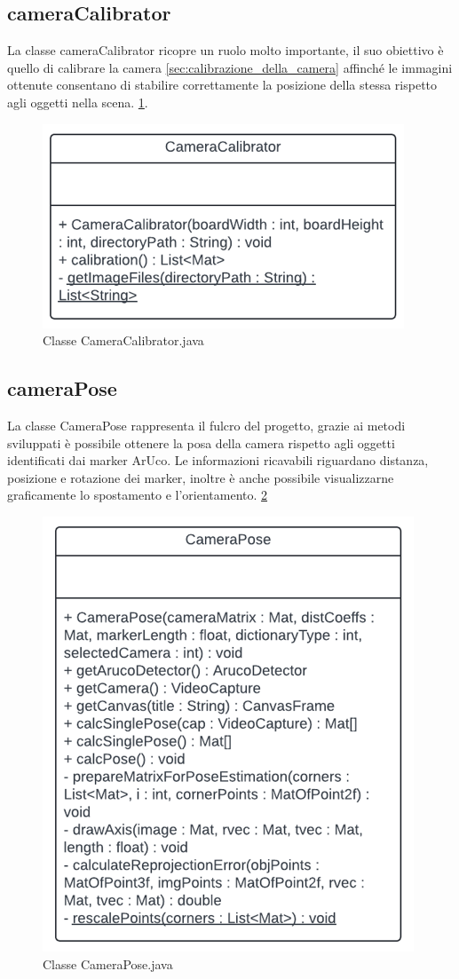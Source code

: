 \documentclass[12pt,a4paper,openright,twoside]{book}
\begin{document}
\subsection{cameraCalibrator}
La classe cameraCalibrator ricopre un ruolo molto importante, il suo obiettivo è quello di calibrare la camera \ref{sec:calibrazione_della_camera} affinché le immagini ottenute consentano di stabilire correttamente la posizione della stessa rispetto agli oggetti nella scena. \ref{fig:camera_calibrator}.
\begin{figure}
	\centering
	\includegraphics[width=0.5\linewidth]{./figures/UML/cameraCalibrator.png}
	\caption{Classe CameraCalibrator.java}
	\label{fig:camera_calibrator}
\end{figure}
\subsection{cameraPose}
La classe CameraPose rappresenta il fulcro del progetto, grazie ai metodi sviluppati è possibile ottenere la posa della camera rispetto agli oggetti identificati dai marker ArUco. Le informazioni ricavabili riguardano distanza, posizione e rotazione dei marker, inoltre è anche possibile visualizzarne graficamente lo spostamento e l'orientamento. \ref{fig:camera_pose}
\begin{figure}
	\centering
	\includegraphics[width=0.5\linewidth]{./figures/UML/cameraPose.png}
	\caption{Classe CameraPose.java}
	\label{fig:camera_pose}
\end{figure}
\end{document}
